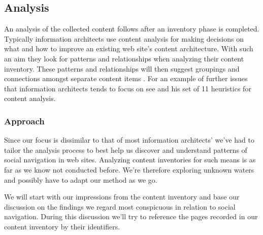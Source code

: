\subsection{Analysis}

An analysis of the collected content follows after an inventory phase is
completed. Typically information architects use content analysis for
making decisions on what and how to improve an existing web site's content
architecture. With such an aim they look for patterns and relationships when
analyzing their content inventory. These patterns and relationships will then
suggest groupings and connections amongst separate content items
\cite[p.~243]{morville06}. For an example of further issues that information
architects tends to focus on see \citet{leise07} and his set of 11 heuristics%
for content analysis.

\subsubsection{Approach}
Since our focus is dissimilar to that of most information architects' we've
had to tailor the analysis process to best help us discover and understand
patterns of social navigation in web sites. Analyzing content inventories for
such means is as far as we know not conducted before. We're therefore
exploring unknown waters and possibly have to adapt our method as we go.

We will start with our impressions from the content inventory%
and base our discussion on the findings we regard most conspicuous in
relation to social navigation. During this discussion we'll try to reference
the pages recorded in our content inventory by their identifiers.
